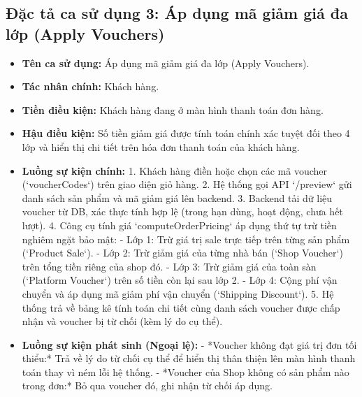 \documentclass[../DoAn.tex]{subfiles}
\begin{document}
\subsection{Đặc tả ca sử dụng 3: Áp dụng mã giảm giá đa lớp (Apply Vouchers)}
\begin{itemize}
\item \textbf{Tên ca sử dụng:} Áp dụng mã giảm giá đa lớp (Apply Vouchers).
\item \textbf{Tác nhân chính:} Khách hàng.
\item \textbf{Tiền điều kiện:} Khách hàng đang ở màn hình thanh toán đơn hàng.
\item \textbf{Hậu điều kiện:} Số tiền giảm giá được tính toán chính xác tuyệt đối theo 4 lớp và hiển thị chi tiết trên hóa đơn thanh toán của khách hàng.
\item \textbf{Luồng sự kiện chính:}
  1. Khách hàng điền hoặc chọn các mã voucher (`voucherCodes`) trên giao diện giỏ hàng.
  2. Hệ thống gọi API `/preview` gửi danh sách sản phẩm và mã giảm giá lên backend.
  3. Backend tải dữ liệu voucher từ DB, xác thực tính hợp lệ (trong hạn dùng, hoạt động, chưa hết lượt).
  4. Công cụ tính giá `computeOrderPricing` áp dụng thứ tự trừ tiền nghiêm ngặt bảo mật:
     - Lớp 1: Trừ giá trị sale trực tiếp trên từng sản phẩm (`Product Sale`).
     - Lớp 2: Trừ giảm giá của từng nhà bán (`Shop Voucher`) trên tổng tiền riêng của shop đó.
     - Lớp 3: Trừ giảm giá của toàn sàn (`Platform Voucher`) trên số tiền còn lại sau lớp 2.
     - Lớp 4: Cộng phí vận chuyển và áp dụng mã giảm phí vận chuyển (`Shipping Discount`).
  5. Hệ thống trả về bảng kê tính toán chi tiết cùng danh sách voucher được chấp nhận và voucher bị từ chối (kèm lý do cụ thể).
\item \textbf{Luồng sự kiện phát sinh (Ngoại lệ):}
  - *Voucher không đạt giá trị đơn tối thiểu:* Trả về lý do từ chối cụ thể để hiển thị thân thiện lên màn hình thanh toán thay vì ném lỗi hệ thống.
  - *Voucher của Shop không có sản phẩm nào trong đơn:* Bỏ qua voucher đó, ghi nhận từ chối áp dụng.
\end{itemize}
\end{document}
